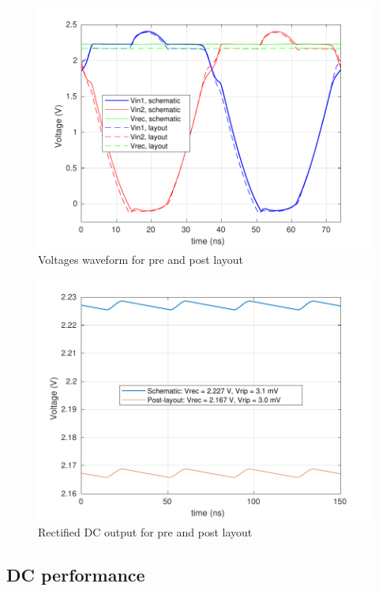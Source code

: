 \documentclass[12pt,a4paper,UKenglish]{report}
\begin{document}
\begin{figure}[H] %
   \centering
   \includegraphics[width=.9\textwidth]{img/rectifier_V_post.pdf} 
   \caption{Voltages waveform for pre and post layout}
   \label{fig:rect_v_post}
\end{figure}

\begin{figure}[H] %
   \centering
   \includegraphics[width=\textwidth]{img/rectifier_ripple.pdf} 
   \caption{Rectified DC output for pre and post layout}
   \label{fig:rect_ripple}
\end{figure}

\subsection{DC performance}		%
\end{document}
